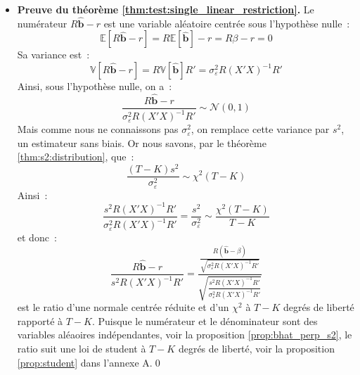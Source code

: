 \documentclass[10pt]{beamer}
\theoremstyle{plain}
\begin{document}
\begin{notes}

  \begin{itemize}

  \item \textbf{Preuve du théorème \ref{thm:test:single_linear_restriction}.} Le numérateur $R\hat{\mathbf b}-r$ est une variable aléatoire centrée sous l'hypothèse nulle~:
    \[
      \mathbb E \left[ R\hat{\mathbf b} - r \right] = R\mathbb E\left[ \hat{\mathbf b} \right] - r = R\beta-r = 0
    \]
    Sa variance est~:
    \[
      \mathbb V\left[ R\hat{\mathbf b}-r\right] = R\mathbb V\left[ \hat{\mathbf b} \right] R' = \sigma_{\varepsilon}^2R(X'X)^{-1}R'
    \]
    Ainsi, sous l'hypothèse nulle, on a~:
    \[
      \frac{R\hat{\mathbf b}-r}{\sigma_{\varepsilon}^2R(X'X)^{-1}R'} \sim \mathcal N(0,1)
    \]
    Mais comme nous ne connaissons pas $\sigma_{\varepsilon}^2$, on remplace cette variance par $s^2$, un estimateur sans biais. Or nous savons, par le théorème \ref{thm:s2:distribution}, que~:
    \[
      \frac{(T-K)s^2}{\sigma_{\varepsilon}^2} \sim \chi^2(T-K)
    \]
    Ainsi~:
    \[
      \frac{s^2R(X'X)^{-1}R'}{\sigma_{\varepsilon}^2R(X'X)^{-1}R'} = \frac{s^2}{\sigma_{\varepsilon}^2} \sim \frac{\chi^2(T-K)}{T-K}
    \]
    et donc~:
    \[
      \frac{R\hat{\mathbf b}-r}{s^2R(X'X)^{-1}R'} =
      \frac{\frac{R\left( \hat{\mathbf b} - \beta \right)}{\sqrt{\sigma_{\varepsilon}^2R(X'X)^{-1}R'}}}
      {\sqrt{\frac{s^2R(X'X)^{-1}R'}{\sigma_{\varepsilon}^2R(X'X)^{-1}R'}}}
    \]
    est le ratio d'une normale centrée réduite et d'un $\chi^2$ à $T-K$ degrés de liberté rapporté à $T-K$. Puisque le numérateur et le dénominateur sont des variables aléaoires indépendantes, voir la proposition \ref{prop:bhat_perp_s2}, le ratio suit une loi de student à $T-K$ degrés de liberté, voir la proposition \ref{prop:student} dans l'annexe A.\qed

  \end{itemize}

\end{notes}
\end{document}
